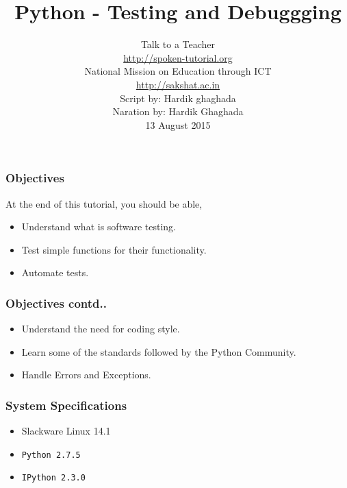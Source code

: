 \documentclass[17pt,compress]{beamer}
\author[FOSSEE]{}
\institute[IIT Bombay]{}
\date[]{}
\begin{document}
\sffamily \bfseries
\title
[Testing and Debuggging]
{Python - Testing and Debuggging}
\author
[FOSSEE, IIT - Bombay]
{\small Talk to a Teacher\\{\color{blue}\url{http://spoken-tutorial.org}}\\National Mission on Education
 through ICT\\{\color{blue}\url{http://sakshat.ac.in}} \\[0.5cm]{\tiny Script by: Hardik ghaghada \\ Naration by: Hardik Ghaghada \\ 13 August 2015}}

\begin{frame}
   \titlepage
\end{frame}
\begin{frame}
\frametitle{Objectives}
\label{sec-2.1}

At the end of this tutorial, you should be able, \pause

\begin{itemize}
\item Understand what is software testing.\pause
\item Test simple functions for their functionality.\pause
\item Automate tests.
\end{itemize}
\end{frame}
\begin{frame}
\frametitle{Objectives contd..}
\label{sec-2.2}

\begin{itemize}
\item Understand the need for coding style.\pause
\item Learn  some of the standards followed by the Python Community.\pause
\item Handle Errors and Exceptions.
\end{itemize}
\end{frame}
\begin{frame}
\frametitle{System Specifications}\pause
\begin{itemize}
\item Slackware Linux 14.1\pause
\item \texttt{Python 2.7.5} \pause
\item \texttt{IPython 2.3.0}
\end{itemize}
\end{frame}
\end{document}
